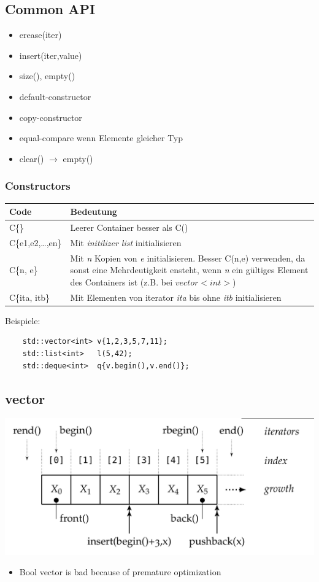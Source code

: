 \subsection{Common API}
\begin{itemize}
	\item erease(iter)
	\item insert(iter,value)
	\item size(), empty()
	\item default-constructor
	\item copy-constructor
	\item equal-compare wenn Elemente gleicher Typ
	\item clear() $\rightarrow$ empty()
\end{itemize}
\subsubsection{Constructors}
	\begin{tabularx}{\columnwidth}{lX}
		Code & Bedeutung \\
		\hline
		C\{\} & Leerer Container besser als C() \\
		C\{e1,e2,\ldots,en\} & Mit \emph{initilizer list} initialisieren \\
		C\{n, e\} & Mit \emph{n} Kopien von \emph{e} initialisieren.  Besser C(n,e) verwenden, da sonst eine Mehrdeutigkeit ensteht, wenn \emph{n} ein gültiges Element des Containers ist (z.B. bei $vector<int>$) \\
		C\{ita, itb\} & Mit Elementen von iterator \emph{ita} bis ohne \emph{itb} initialisieren \\
	\end{tabularx}
	Beispiele:
\begin{lstlisting}
	std::vector<int> v{1,2,3,5,7,11};
	std::list<int>   l(5,42);
	std::deque<int>  q{v.begin(),v.end()};
\end{lstlisting}

\subsection{vector}
\begin{center}
\includegraphics[width=\linewidth]{./bilder/iterators}
\end{center}
\begin{itemize}
\item Bool vector is bad because of premature optimization
\end{itemize}



